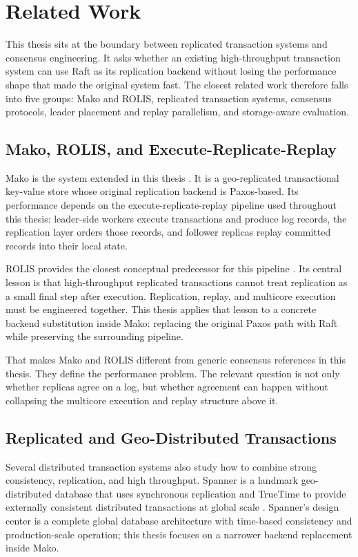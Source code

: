 \chapter{Related Work}

This thesis sits at the boundary between replicated transaction systems and
consensus engineering. It asks whether an existing high-throughput transaction
system can use Raft as its replication backend without losing the performance
shape that made the original system fast. The closest related work therefore
falls into five groups: Mako and ROLIS, replicated transaction systems,
consensus protocols, leader placement and replay parallelism, and
storage-aware evaluation.

\section{Mako, ROLIS, and Execute-Replicate-Replay}

Mako is the system extended in this thesis \cite{mako-osdi25}. It is a
geo-replicated transactional key-value store whose original replication
backend is Paxos-based. Its performance depends on the
execute-replicate-replay pipeline used throughout this thesis: leader-side
workers execute transactions and produce log records, the replication layer
orders those records, and follower replicas replay committed records into
their local state.

ROLIS provides the closest conceptual predecessor for this pipeline
\cite{rolis-eurosys22}. Its central lesson is that high-throughput replicated
transactions cannot treat replication as a small final step after execution.
Replication, replay, and multicore execution must be engineered together. This
thesis applies that lesson to a concrete backend substitution inside Mako:
replacing the original Paxos path with Raft while preserving the surrounding
pipeline.

That makes Mako and ROLIS different from generic consensus references in this
thesis. They define the performance problem. The relevant question is not
only whether replicas agree on a log, but whether agreement can happen without
collapsing the multicore execution and replay structure above it.

\section{Replicated and Geo-Distributed Transactions}

Several distributed transaction systems also study how to combine strong
consistency, replication, and high throughput. Spanner is a landmark
geo-distributed database that uses synchronous replication and TrueTime to
provide externally consistent distributed transactions at global scale
\cite{spanner-osdi12}. Spanner's design center is a complete global database
architecture with time-based consistency and production-scale operation; this
thesis focuses on a narrower backend replacement inside Mako.

